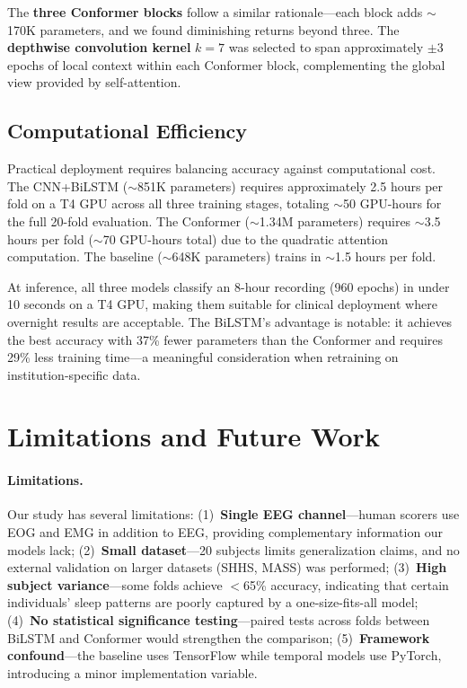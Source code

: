 \documentclass[final]{article}
\begin{document}
The \textbf{three Conformer blocks} follow a similar rationale---each block adds $\sim$170K parameters, and we found diminishing returns beyond three. The \textbf{depthwise convolution kernel} $k = 7$ was selected to span approximately $\pm$3 epochs of local context within each Conformer block, complementing the global view provided by self-attention.

\subsection{Computational Efficiency}

Practical deployment requires balancing accuracy against computational cost. The CNN+BiLSTM ($\sim$851K parameters) requires approximately 2.5 hours per fold on a T4 GPU across all three training stages, totaling $\sim$50 GPU-hours for the full 20-fold evaluation. The Conformer ($\sim$1.34M parameters) requires $\sim$3.5 hours per fold ($\sim$70 GPU-hours total) due to the quadratic attention computation. The baseline ($\sim$648K parameters) trains in $\sim$1.5 hours per fold.

At inference, all three models classify an 8-hour recording (960 epochs) in under 10 seconds on a T4 GPU, making them suitable for clinical deployment where overnight results are acceptable. The BiLSTM's advantage is notable: it achieves the best accuracy with 37\% fewer parameters than the Conformer and requires 29\% less training time---a meaningful consideration when retraining on institution-specific data.

\section{Limitations and Future Work}

\paragraph{Limitations.}
Our study has several limitations: (1)~\textbf{Single EEG channel}---human scorers use EOG and EMG in addition to EEG, providing complementary information our models lack; (2)~\textbf{Small dataset}---20 subjects limits generalization claims, and no external validation on larger datasets (SHHS, MASS) was performed; (3)~\textbf{High subject variance}---some folds achieve $<$65\% accuracy, indicating that certain individuals' sleep patterns are poorly captured by a one-size-fits-all model; (4)~\textbf{No statistical significance testing}---paired tests across folds between BiLSTM and Conformer would strengthen the comparison; (5)~\textbf{Framework confound}---the baseline uses TensorFlow while temporal models use PyTorch, introducing a minor implementation variable.
\end{document}
